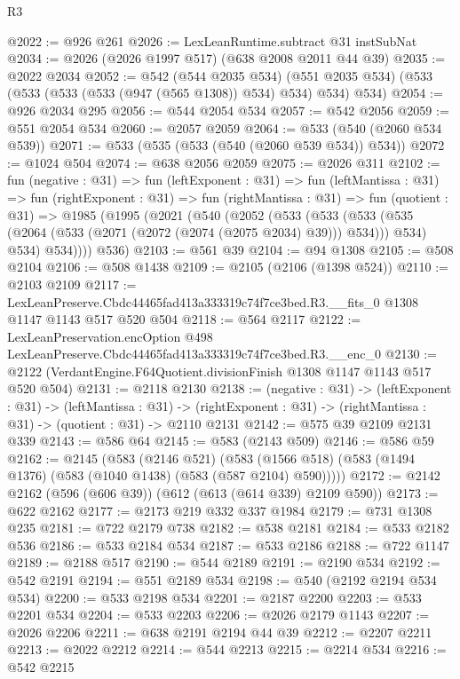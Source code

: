 \begin{lexlean}{R3}
\begin{coremodule}
@2022 := @926 @261
@2026 := LexLeanRuntime.subtract @31 instSubNat
@2034 := @2026 (@2026 @1997 @517) (@638 @2008 @2011 @44 @39)
@2035 := @2022 @2034
@2052 := @542
    (@544 @2035 @534)
    (@551 @2035 @534)
    (@533 (@533 (@533 (@533 (@947 (@565 @1308)) @534) @534) @534) @534)
@2054 := @926 @2034 @295
@2056 := @544 @2054 @534
@2057 := @542 @2056
@2059 := @551 @2054 @534
@2060 := @2057 @2059
@2064 := @533 (@540 (@2060 @534 @539))
@2071 := @533 (@535 (@533 (@540 (@2060 @539 @534)) @534))
@2072 := @1024 @504
@2074 := @638 @2056 @2059
@2075 := @2026 @311
@2102 := fun (negative : @31) =>
  fun (leftExponent : @31) =>
  fun (leftMantissa : @31) =>
  fun (rightExponent : @31) =>
  fun (rightMantissa : @31) =>
  fun (quotient : @31) =>
  @1985
    (@1995
      (@2021
        (@540
          (@2052
            (@533
              (@533
                (@533 (@535 (@2064 (@533 (@2071 (@2072 (@2074 (@2075 @2034) @39))) @534))) @534)
                @534)
              @534))))
      @536)
@2103 := @561 @39
@2104 := @94 @1308
@2105 := @508 @2104
@2106 := @508 @1438
@2109 := @2105 (@2106 (@1398 @524))
@2110 := @2103 @2109
@2117 := LexLeanPreserve.Cbdc44465fad413a333319c74f7ce3bed.R3.__fits_0
    @1308
    @1147
    @1143
    @517
    @520
    @504
@2118 := @564 @2117
@2122 := LexLeanPreservation.encOption
    @498
    LexLeanPreserve.Cbdc44465fad413a333319c74f7ce3bed.R3.__enc_0
@2130 := @2122 (VerdantEngine.F64Quotient.divisionFinish @1308 @1147 @1143 @517 @520 @504)
@2131 := @2118 @2130
@2138 := (negative : @31) ->
  (leftExponent : @31) ->
  (leftMantissa : @31) ->
  (rightExponent : @31) -> (rightMantissa : @31) -> (quotient : @31) -> @2110 @2131
@2142 := @575 @39 @2109 @2131 @339
@2143 := @586 @64
@2145 := @583 (@2143 @509)
@2146 := @586 @59
@2162 := @2145
    (@583
      (@2146 @521)
      (@583 (@1566 @518) (@583 (@1494 @1376) (@583 (@1040 @1438) (@583 (@587 @2104) @590)))))
@2172 := @2142 @2162 (@596 (@606 @39)) (@612 (@613 (@614 @339) @2109 @590))
@2173 := @622 @2162
@2177 := @2173 @219 @332 @337 @1984
@2179 := @731 @1308 @235
@2181 := @722 @2179 @738
@2182 := @538 @2181
@2184 := @533 @2182 @536
@2186 := @533 @2184 @534
@2187 := @533 @2186
@2188 := @722 @1147
@2189 := @2188 @517
@2190 := @544 @2189
@2191 := @2190 @534
@2192 := @542 @2191
@2194 := @551 @2189 @534
@2198 := @540 (@2192 @2194 @534 @534)
@2200 := @533 @2198 @534
@2201 := @2187 @2200
@2203 := @533 @2201 @534
@2204 := @533 @2203
@2206 := @2026 @2179 @1143
@2207 := @2026 @2206
@2211 := @638 @2191 @2194 @44 @39
@2212 := @2207 @2211
@2213 := @2022 @2212
@2214 := @544 @2213
@2215 := @2214 @534
@2216 := @542 @2215

\end{coremodule}
\end{lexlean}
